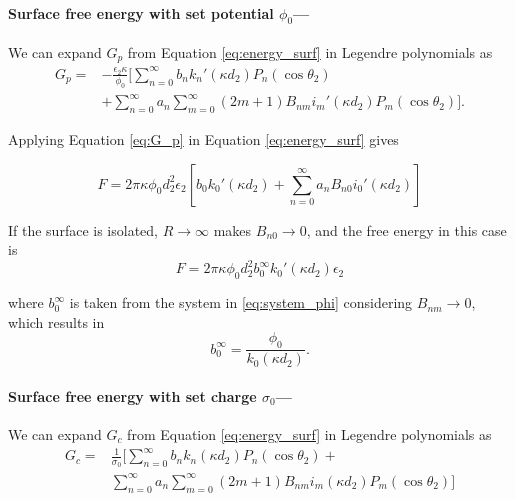 \medskip
\paragraph*{Surface  free energy with set potential $\phi_0$---}
We can expand $G_p$ from Equation \eqref{eq:energy_surf} in Legendre polynomials as
%
\begin{align} \label{eq:G_p}
G_p = &-\frac{\epsilon_2 \kappa}{\phi_0}  \Bigg[ \sum_{n=0}^{\infty} b_n k_n'(\kappa d_2) P_n(\cos \theta_2) \nonumber \\ 
& + \sum_{n=0}^{\infty} a_n \sum_{m=0}^{\infty} (2m+1) B_{nm} i_m'(\kappa d_2) P_m(\cos \theta_2) \Bigg].
\end{align}

 \noindent Applying Equation \eqref{eq:G_p} in Equation \eqref{eq:energy_surf} gives

\begin{equation} \label{G_p_int}
F = 2\pi \kappa \phi_0 d_2^2 \epsilon_2 \left[ b_0 k_0'(\kappa d_2) + \sum_{n=0}^{\infty} a_n B_{n0} i_0'(\kappa d_2) \right]
\end{equation}

 \noindent If the surface is isolated, $R \to \infty$ makes $B_{n0} \to 0$, and the free energy in this case is 
%
\begin{equation} \label{energy_isolated_phi}
F = 2\pi \kappa \phi_0 d_2^2 b_0^{\infty} k_0'(\kappa d_2) \epsilon_2
\end{equation}
 
 \noindent where $b_0^{\infty}$ is taken from the system in  \eqref{eq:system_phi} considering $B_{nm} \to 0$, which results in
 \begin{equation} \label{b_inf_phi}
 b_0^{\infty} = \frac{\phi_0}{k_0(\kappa d_2)}.
 \end{equation}
 
 \medskip
 \paragraph*{Surface  free energy with set charge $\sigma_0$---}
We can expand $G_c$ from Equation \eqref{eq:energy_surf} in Legendre polynomials as
%
\begin{align} \label{eq:G_c}
G_c = & \frac{1}{\sigma_0} \Bigg[ \sum_{n=0}^{\infty} b_n k_n(\kappa d_2) P_n(\cos \theta_2) + \nonumber \\ 
&\sum_{n=0}^{\infty} a_n \sum_{m=0}^{\infty} (2m+1) B_{nm} i_m(\kappa d_2) P_m(\cos \theta_2) \Bigg]
\end{align}

